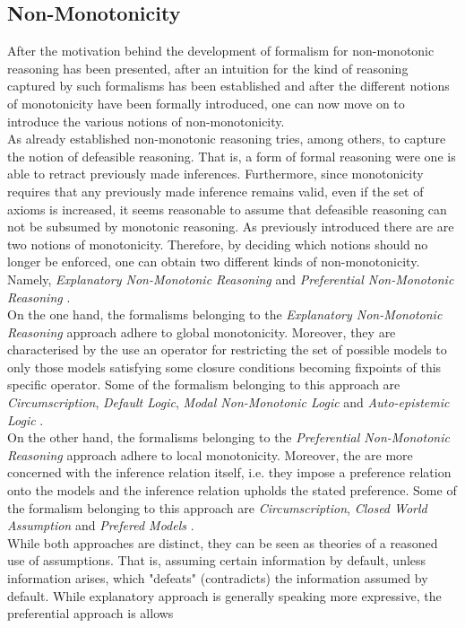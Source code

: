 \documentclass{article}
\begin{document}
\subsection{Non-Monotonicity}
After the motivation behind the development of formalism for non-monotonic reasoning has been presented, after an intuition for the kind of reasoning captured by such formalisms has been established and after the different notions of monotonicity have been formally introduced, one can now move on to introduce the various notions of non-monotonicity. \\
As already established non-monotonic reasoning tries, among others, to capture the notion of defeasible reasoning. That is, a form of formal reasoning were one is able to retract previously made inferences. Furthermore, since monotonicity requires that any previously made inference remains valid, even if the set of axioms is increased, it seems reasonable to assume that defeasible reasoning can not be subsumed by monotonic reasoning.
As previously introduced there are are two notions of monotonicity. Therefore, by deciding which notions should no longer be enforced, one can obtain two different kinds of non-monotonicity. Namely, \emph{Explanatory Non-Monotonic Reasoning} and \emph{Preferential Non-Monotonic Reasoning} \cite{nonmonoton_stanford2018, BOCHMAN2007557}.\\
On the one hand, the formalisms belonging to the \emph{Explanatory Non-Monotonic Reasoning} approach adhere to global monotonicity. Moreover, they are characterised by the use an operator for restricting the set of possible models to only those models satisfying some closure conditions becoming fixpoints of this specific operator. Some of the formalism belonging to this approach are \emph{Circumscription}, \emph{Default Logic}, \emph{Modal Non-Monotonic Logic} and \emph{Auto-epistemic Logic} \cite{bochman2005explanatory,brewka1997nonmonotonic}.\\
On the other hand, the formalisms belonging to the \emph{Preferential Non-Monotonic Reasoning} approach adhere to local monotonicity. Moreover, the are more concerned with the inference relation itself, i.e. they impose a preference relation onto the models and the inference relation upholds the stated preference.  Some of the formalism belonging to this approach are \emph{Circumscription}, \emph{Closed World Assumption} and \emph{Prefered Models} \cite{bochman2005explanatory,brewka1997nonmonotonic}.\\
While both approaches are distinct, they can be seen as theories of a reasoned use of assumptions. That is, assuming certain information by default, unless information arises, which "defeats" (contradicts) the information assumed by default. While explanatory approach is generally speaking more expressive, the preferential approach is allows 
\cite{bochman2005explanatory}\\
\end{document}
